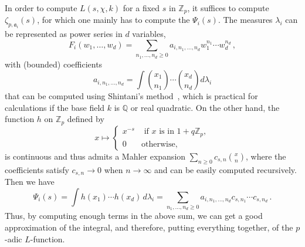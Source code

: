 \documentclass{amsart}
\begin{document}
In order to compute $L(s, \chi, k)$ for a fixed  $s$ in
${\mathbb Z_p}$, it suffices to compute $\zeta_{p, \mathfrak{a}_i}(s)$,
for which one mainly has to compute the $ \Psi_i(s) $.
The measures $\lambda_i$ can be represented as power
series in $ d $ variables,
$$
F_i(w_1, \dots, w_d) = \sum_{n_1, \dots, n_d \geq 0} a_{i, n_1, \dots, n_d} w_1^{n_1} \cdots w_d^{n_d} \,,
$$
with (bounded) coefficients
\begin{equation*}
 a_{i, n_1, \dots, n_d} = \int {x_1 \choose n_1} \cdots {x_d \choose n_d} d \lambda_i
\end{equation*}
that can be computed using Shintani's method~\cite{Shin76},
which is practical for calculations if the base field $k$ is ${\mathbb Q}$ or real
quadratic.  On the other hand, the function $ h $ on ${\mathbb Z_p}$ defined by
$$
x \mapsto
\begin{cases}
  x^{-s} & \text{ if } x \text{ is in } 1+q{\mathbb Z_p}, 
\\
  0 & \text{otherwise},
\end{cases} 
$$
is continuous and thus admits a Mahler expansion $\sum_{n \geq 0} c_{s, n} \binom{x}{n}$, where the
coefficients satisfy $c_{s, n} \to 0$ when $n \to \infty$ and can be easily computed recursively.  Then
we have 
\begin{equation*}
\Psi_i(s)
=
\int  h(x_1) \cdots h(x_d) \, d\lambda_i 
=
\sum_{n_1, \dots, n_d \geq 0} a_{i, n_1, \dots, n_d} c_{s,
  n_1} \cdots c_{s, n_d} \,. 
\end{equation*}
Thus, by computing enough terms in the above sum, we can get a good
approximation of the integral, and therefore, putting 
everything together, of the $p$-adic $L$-function.
 
\smallskip
\end{document}
